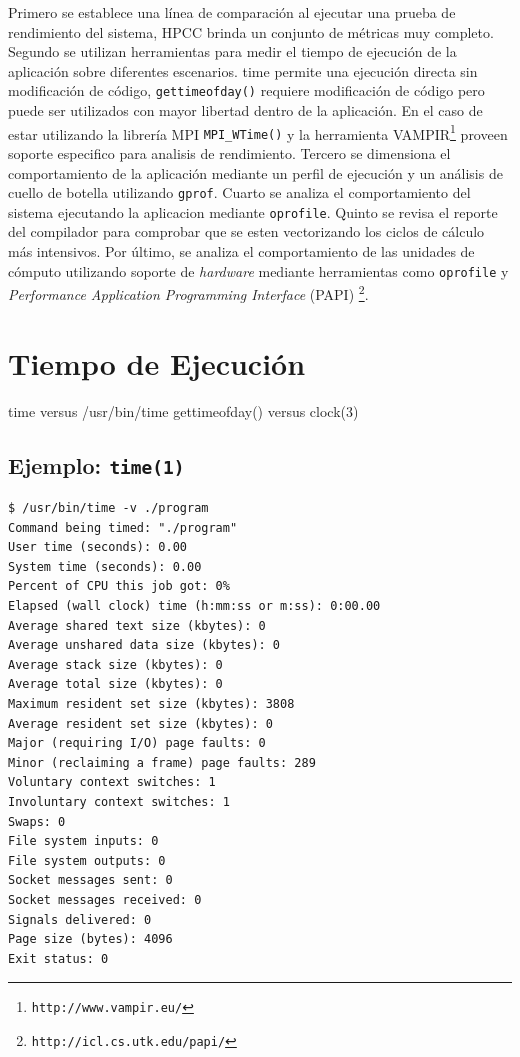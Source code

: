 \documentclass[a4paper]{report}
\begin{document}
Primero se establece una l\'inea de comparaci\'on al ejecutar una prueba de rendimiento del sistema, HPCC brinda un conjunto de m\'etricas muy completo. Segundo se utilizan herramientas para medir el tiempo de ejecuci\'on de la aplicaci\'on sobre diferentes escenarios. time permite una ejecuci\'on directa sin modificaci\'on de c\'odigo, {\tt gettimeofday()} requiere modificaci\'on de c\'odigo pero puede ser utilizados con mayor libertad dentro de la aplicaci\'on.  
En el caso de estar utilizando la librer\'ia MPI {\tt MPI\_WTime()} y la herramienta VAMPIR\footnote{\tt http://www.vampir.eu/} proveen soporte especifico para analisis de rendimiento.
Tercero se dimensiona el comportamiento de la aplicaci\'on mediante un perfil de ejecuci\'on y un an\'alisis de cuello de botella utilizando {\tt gprof}. Cuarto se analiza el comportamiento del sistema ejecutando la aplicacion mediante {\tt oprofile}. Quinto se revisa el reporte del compilador para comprobar que se esten vectorizando los ciclos de c\'alculo m\'as intensivos. Por último, se analiza el comportamiento de las unidades de c\'omputo utilizando soporte de {\it hardware} mediante herramientas como {\tt oprofile} y {\it Performance Application Programming Interface} (PAPI) \footnote{\tt http://icl.cs.utk.edu/papi/}.

\section{Tiempo de Ejecuci\'on}

time versus /usr/bin/time
gettimeofday() versus clock(3)

\subsection{Ejemplo: {\tt time(1)}}

\begin{lstlisting} 
$ /usr/bin/time -v ./program
Command being timed: "./program"
User time (seconds): 0.00
System time (seconds): 0.00
Percent of CPU this job got: 0%
Elapsed (wall clock) time (h:mm:ss or m:ss): 0:00.00
Average shared text size (kbytes): 0
Average unshared data size (kbytes): 0
Average stack size (kbytes): 0
Average total size (kbytes): 0
Maximum resident set size (kbytes): 3808
Average resident set size (kbytes): 0
Major (requiring I/O) page faults: 0
Minor (reclaiming a frame) page faults: 289
Voluntary context switches: 1
Involuntary context switches: 1
Swaps: 0
File system inputs: 0
File system outputs: 0
Socket messages sent: 0
Socket messages received: 0
Signals delivered: 0
Page size (bytes): 4096
Exit status: 0
\end{lstlisting}
\end{document}
